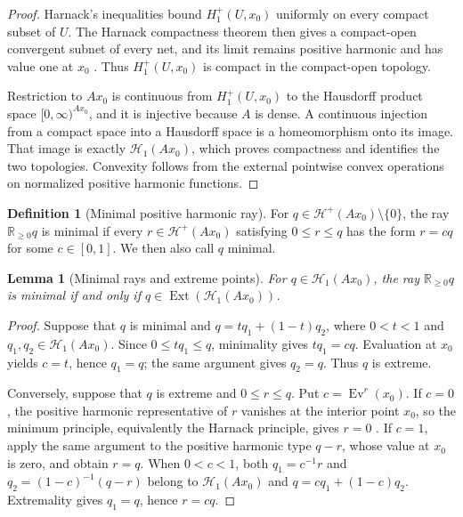 \documentclass{amsart}
\newtheorem{lemma}[theorem]{Lemma}
\theoremstyle{definition}
\newtheorem{definition}{Definition}[section]
\theoremstyle{remark}
\numberwithin{equation}{section}
\begin{document}
\begin{proof}
Harnack's inequalities bound $H_1^+(U,x_0)$ uniformly on every compact subset of $U$. The Harnack compactness theorem then gives a compact-open convergent subnet of every net, and its limit remains positive harmonic and has value one at $x_0$ \cite[Theorem~1]{LW1965axiomatic}. Thus $H_1^+(U,x_0)$ is compact in the compact-open topology.

Restriction to $Ax_0$ is continuous from $H_1^+(U,x_0)$ to the Hausdorff product space $[0,\infty)^{Ax_0}$, and it is injective because $A$ is dense. A continuous injection from a compact space into a Hausdorff space is a homeomorphism onto its image. That image is exactly $\mathscr H_1(Ax_0)$, which proves compactness and identifies the two topologies. Convexity follows from the external pointwise convex operations on normalized positive harmonic functions.
\end{proof}

\begin{definition}[Minimal positive harmonic ray]
\label{def:minimal-positive-harmonic-ray}
For $q\in\mathscr H^+(Ax_0)\setminus\{0\}$, the ray $\mathbb R_{\ge0}q$ is minimal if every $r\in\mathscr H^+(Ax_0)$ satisfying $0\le r\le q$ has the form $r=cq$ for some $c\in[0,1]$. We then also call $q$ minimal.
\end{definition}


\begin{lemma}[Minimal rays and extreme points]
\label{lem:minimal-type-extreme}
For $q\in\mathscr H_1(Ax_0)$, the ray $\mathbb R_{\ge0}q$ is minimal if and only if $q\in\operatorname{Ext}(\mathscr H_1(Ax_0))$.
\end{lemma}

\begin{proof}
Suppose that $q$ is minimal and $q=tq_1+(1-t)q_2$, where $0<t<1$ and $q_1,q_2\in\mathscr H_1(Ax_0)$. Since $0\le tq_1\le q$, minimality gives $tq_1=cq$. Evaluation at $x_0$ yields $c=t$, hence $q_1=q$; the same argument gives $q_2=q$. Thus $q$ is extreme.

Conversely, suppose that $q$ is extreme and $0\le r\le q$. Put $c=\operatorname{Ev}^r(x_0)$. If $c=0$, the positive harmonic representative of $r$ vanishes at the interior point $x_0$, so the minimum principle, equivalently the Harnack principle, gives $r=0$ \cite[Theorem~1]{LW1965axiomatic}. If $c=1$, apply the same argument to the positive harmonic type $q-r$, whose value at $x_0$ is zero, and obtain $r=q$. When $0<c<1$, both $q_1=c^{-1}r$ and $q_2=(1-c)^{-1}(q-r)$ belong to $\mathscr H_1(Ax_0)$ and $q=cq_1+(1-c)q_2$. Extremality gives $q_1=q$, hence $r=cq$.
\end{proof}
\end{document}
